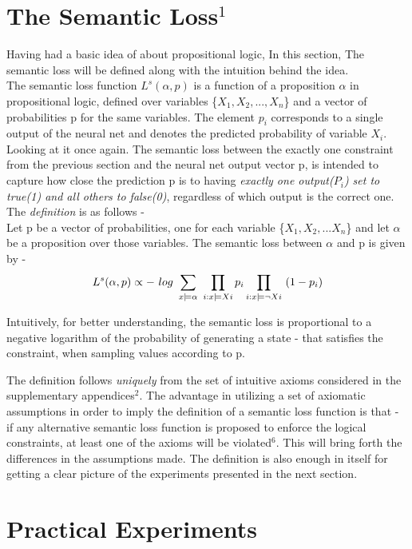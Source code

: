 \documentclass[12pt]{article}
\begin{document}
\section{The Semantic Loss$^1$}
Having had a basic idea of about propositional logic, In this section, The semantic loss will be defined along with the intuition behind the idea.\\
The semantic loss function $L^s(\alpha,p)$ is a function of a proposition $\alpha$ in propositional logic, defined over variables \{$X_1, X_2,...,X_n$\} and a vector of probabilities p for the same variables. The element $p_i$ corresponds to a single output of the neural net and denotes the predicted probability of variable $X_i$.\\
Looking at it once again. The semantic loss between the exactly one constraint from the previous section and the neural net output vector p, is intended to capture how close the prediction p is to having \textit{exactly one output($P_i$) set to true(1) and all others to false(0)}, regardless of which output is the correct one.\\
The \textit{definition} is as follows - \\ 
Let p be a vector of probabilities, one for each variable \{$X_1, X_2,...X_n$\} and let $\alpha$ be a proposition over those variables. The semantic loss between $\alpha$ and p is given by -
\begin{displaymath}
L^s(\alpha,p) \propto -\ log \ \sum_{x\models\alpha} \ \prod_{i:x\models Xi} p_i \\ \prod_{i:x\models\neg Xi} \ (1-p_i) \end{displaymath} 

Intuitively, for better understanding, the semantic loss is proportional to a negative logarithm of the probability of generating a state - that satisfies the constraint, when sampling values according to p.

The definition follows \textit{uniquely} from the set of intuitive axioms considered in the supplementary appendices$^2$.
The advantage in utilizing a set of axiomatic assumptions in order to imply the definition of a semantic loss function is that - if any alternative semantic loss function is proposed to enforce the logical constraints, at least one of the axioms will be violated$^6$. This will bring forth the differences in the assumptions made. The definition is also enough in itself for getting a clear picture of the experiments presented in the next section.


\section{Practical Experiments}
\end{document}
